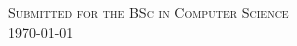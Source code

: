 \begin{titlepage}
\textsc{\large Submitted for the BSc in Computer Science}\\[0.5cm]



{\large \today}\\[2cm] %


\\[1cm]
 

\vfill %

\end{titlepage}
